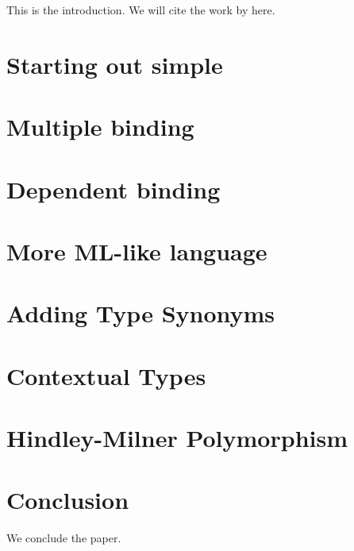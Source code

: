 \documentclass[format=acmlarge,review,anonymous]{acmart}\settopmatter{printfolios=true}
\begin{document}
\TODO{} This is the introduction. We will cite the work by \citet{miller1988overview} here.

\section{Starting out simple}


\section{Multiple binding}


\section{Dependent binding}


\section{More ML-like language}


\section{Adding Type Synonyms}


\section{Contextual Types}


\section{Hindley-Milner Polymorphism}


\section{Conclusion}

\TODO{} We conclude the paper.


\end{document}
